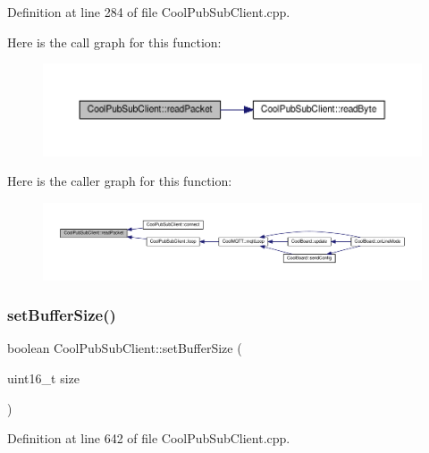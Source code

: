 Definition at line 284 of file Cool\+Pub\+Sub\+Client.\+cpp.

Here is the call graph for this function\+:
\nopagebreak
\begin{figure}[H]
\begin{center}
\leavevmode
\includegraphics[width=350pt]{class_cool_pub_sub_client_a25a8779149cfa809b7c06f63568b25cf_cgraph}
\end{center}
\end{figure}
Here is the caller graph for this function\+:
\nopagebreak
\begin{figure}[H]
\begin{center}
\leavevmode
\includegraphics[width=350pt]{class_cool_pub_sub_client_a25a8779149cfa809b7c06f63568b25cf_icgraph}
\end{center}
\end{figure}
\mbox{\label{class_cool_pub_sub_client_a4f83e54f1ba96e32f725d93cdec283b7}} 
\subsubsection{\texorpdfstring{set\+Buffer\+Size()}{setBufferSize()}}
{\footnotesize\ttfamily boolean Cool\+Pub\+Sub\+Client\+::set\+Buffer\+Size (\begin{DoxyParamCaption}\item[{uint16\+\_\+t}]{size }\end{DoxyParamCaption})}



Definition at line 642 of file Cool\+Pub\+Sub\+Client.\+cpp.

